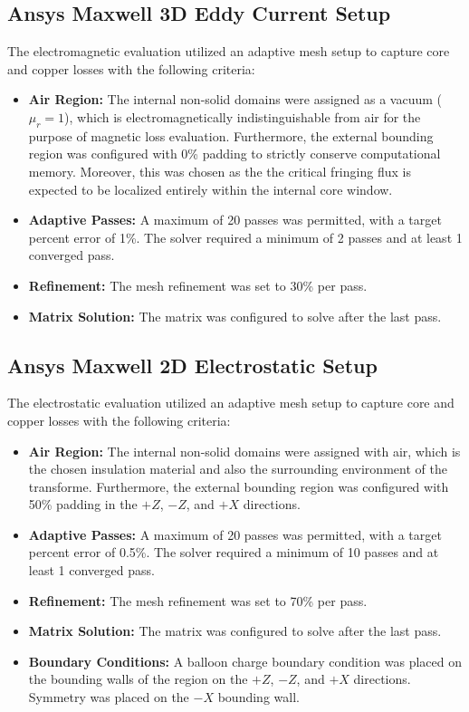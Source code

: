 \subsection*{Ansys Maxwell 3D Eddy Current Setup}
The electromagnetic evaluation utilized an adaptive mesh setup to capture core and copper losses with the following criteria:
\begin{itemize}
    \item \textbf{Air Region:} The internal non-solid domains were assigned as a vacuum ($\mu_r = 1$), which is electromagnetically indistinguishable from air for the purpose of magnetic loss evaluation. Furthermore, the external bounding region was configured with 0\% padding to strictly conserve computational memory. Moreover, this was chosen as the the critical fringing flux is expected to be localized entirely within the internal core window.
    \item \textbf{Adaptive Passes:} A maximum of 20 passes was permitted, with a target percent error of 1\%. The solver required a minimum of 2 passes and at least 1 converged pass.
    \item \textbf{Refinement:} The mesh refinement was set to 30\% per pass.
    \item \textbf{Matrix Solution:} The matrix was configured to solve after the last pass.
\end{itemize}

\subsection*{Ansys Maxwell 2D Electrostatic Setup}
The electrostatic evaluation utilized an adaptive mesh setup to capture core and copper losses with the following criteria:
\begin{itemize}
    \item \textbf{Air Region:} The internal non-solid domains were assigned with air, which is the chosen insulation material and also the surrounding environment of the transforme. Furthermore, the external bounding region was configured with 50\% padding in the $+Z$, $-Z$, and $+X$ directions.
    \item \textbf{Adaptive Passes:} A maximum of 20 passes was permitted, with a target percent error of 0.5\%. The solver required a minimum of 10 passes and at least 1 converged pass.
    \item \textbf{Refinement:} The mesh refinement was set to 70\% per pass.
    \item \textbf{Matrix Solution:} The matrix was configured to solve after the last pass.
    \item \textbf{Boundary Conditions:} A balloon charge boundary condition was placed on the bounding walls of the region on the $+Z$, $-Z$, and $+X$ directions. Symmetry was placed on the $-X$ bounding wall.
\end{itemize}


